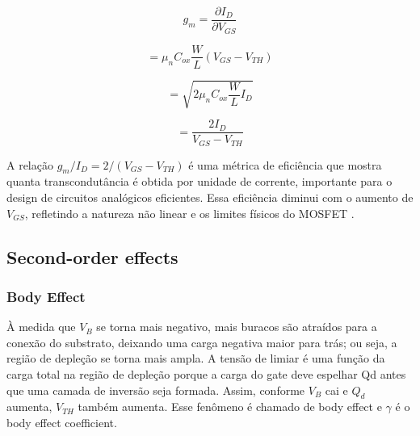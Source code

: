 \documentclass[10pt, conference,a4paper]{IEEEtran}
\begin{document}
\begin{equation}
    g_m = \frac{\partial I_{D}}{\partial V_{GS}}  \label{eq:transconductance}
\end{equation}

\begin{equation}
     = \mu_n C_{ox} \frac{W}{L} (V_{GS} - V_{TH}) \label{eq:transconductance1}
\end{equation}

\begin{equation}
     = \sqrt{2 \mu_n C_{ox} \frac{W}{L} I_D} \label{eq:transconductance2}
\end{equation}

\begin{equation}
     = \frac{2 I_D}{V_{GS} - V_{TH}} \label{eq:transconductance2}
\end{equation}

A relação $g_m/I_D = 2/(V_{GS} - V_{TH})$ é uma métrica de eficiência que mostra quanta transcondutância é obtida por unidade de corrente, importante para o design de circuitos analógicos eficientes. Essa eficiência diminui com o aumento de $V_{GS}$, refletindo a natureza não linear e os limites físicos do MOSFET \cite{youtube_gm/Id}.

\begin{comment}
\begin{equation}
    r_o = \frac{1}{g_m}
    \label{eq:res_out}
\end{equation}

Tensão de drain
\begin{equation}
    V_D = -g_m V_{GS} r_o
\end{equation}

Ganho intrínseco do transistor
\begin{equation}
    V_D = \left | A_v \right | = \frac{V_D}{V_{GS}} = g_m r_o
\end{equation}
\end{comment}

\subsection{Second-order effects}

\subsubsection{Body Effect} À medida que $V_B$ se torna mais negativo, mais buracos são atraídos para a conexão do substrato, deixando uma carga negativa maior para trás; ou seja, a região de depleção se torna
mais ampla. A tensão de limiar é uma função da carga total na região de depleção
porque a carga do gate deve espelhar Qd antes que uma camada de inversão seja formada. Assim, conforme $V_B$ cai e $Q_d$ aumenta, $V_{TH}$ também aumenta. Esse fenômeno é chamado de body effect e $\gamma$ é o body effect coefficient.
\end{document}
